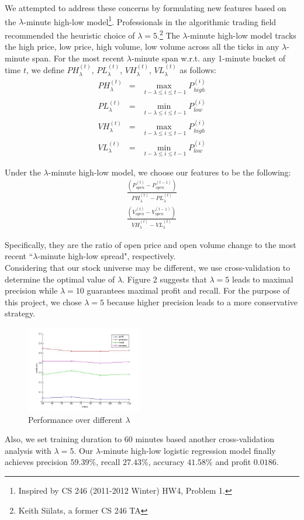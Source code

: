 \documentclass[10pt,twocolumn,letterpaper]{article}
\newcommand{\maxx}[1]{\underset{#1}{\operatorname{max}\;}}
\newcommand{\minx}[1]{\underset{#1}{\operatorname{min}\;}}
\begin{document}
We attempted to address these concerns by formulating new features based on the $\lambda$-minute high-low model\footnote{Inspired by CS 246 (2011-2012 Winter) HW4, Problem 1.}. Professionals in the algorithmic trading field recommended the heuristic choice of $\lambda=5.$\footnote{Keith Siilats, a former CS 246 TA} The $\lambda$-minute high-low model tracks the high price, low price, high volume, low volume across all the ticks in any $\lambda$-minute span. For the most recent $\lambda$-minute span w.r.t. any 1-minute bucket of time $t$, we define $PH_{\lambda}^{(t)}$, $PL_{\lambda}^{(t)}$, $VH_{\lambda}^{(t)}$, $VL_{\lambda}^{(t)}$ as follows:
\begin{eqnarray}
PH_{\lambda}^{(t)} &=& \maxx{t - \lambda \leq i \leq t - 1}P^{(i)}_{high} \\
PL_{\lambda}^{(t)} &=& \minx{t - \lambda \leq i \leq t - 1}P^{(i)}_{low} \\
VH_{\lambda}^{(t)} &=& \maxx{t - \lambda \leq i \leq t - 1}P^{(i)}_{high} \\
VL_{\lambda}^{(t)} &=& \minx{t - \lambda \leq i \leq t - 1}P^{(i)}_{low}
\end{eqnarray}

Under the $\lambda$-minute high-low model, we choose our features to be the following:
\begin{eqnarray}
\frac{\left(P_{open}^{(t)} - P_{open}^{(t-1)}\right)}{PH_\lambda^{(t)}-PL_\lambda^{(t)}} \\
\frac{\left(V_{open}^{(t)} - V_{open}^{(t-1)}\right)}{VH_\lambda^{(t)}-VL_\lambda^{(t)}}
\end{eqnarray}

Specifically, they are the ratio of open price and open volume change to the most recent ``$\lambda$-minute high-low spread", respectively.\\

Considering that our stock universe may be different, we use cross-validation to determine the optimal value of $\lambda$. Figure 2 suggests that $\lambda=5$ leads to maximal precision while $\lambda=10$ guarantees maximal profit and recall. For the purpose of this project, we chose $\lambda=5$ because higher precision leads to a more conservative strategy.
\begin{figure}[H]
\caption{Performance over different $\lambda$}
\includegraphics[width=0.45\textwidth]{lambda_reg}
\end{figure}
Also, we set training duration to 60 minutes based another cross-validation analysis with $\lambda=5$. Our $\lambda$-minute high-low logistic regression model finally achieves precision $59.39\%$, recall $27.43\%$, accuracy $41.58\%$ and profit $0.0186$.
\end{document}
